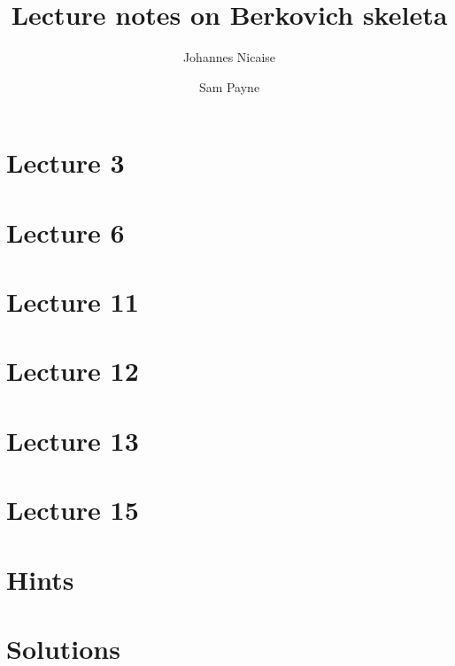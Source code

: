 \documentclass[10pt,a4paper,twoside]{article}
\title{Lecture notes on Berkovich skeleta}
\author{Johannes Nicaise \and Sam Payne}
\numberwithin{equation}{section}
\begin{document}
\maketitle

\tableofcontents




\section{Lecture 3}


\section{Lecture 6}




\section{Lecture 11}
\section{Lecture 12}
\section{Lecture 13}

\section{Lecture 15}


\cleartoevenpage
\section{Hints}


\cleartoevenpage
\section{Solutions}

\end{document}
